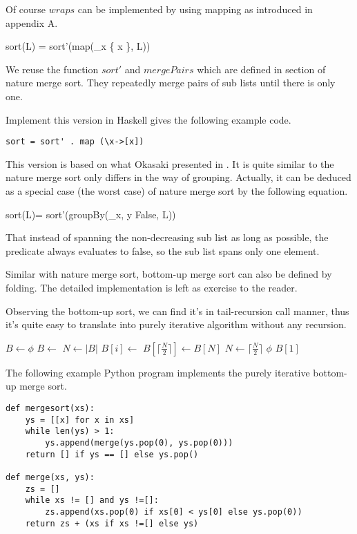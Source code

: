 \documentclass[UTF8]{article}
\begin{document}
Of course $wraps$ can be implemented by using mapping as introduced in appendix A.

\be
sort(L) = sort'(map(\lambda_x \cdot \{ x \}, L))
\ee

We reuse the function $sort'$ and $mergePairs$ which are defined in section of nature merge sort. They
repeatedly merge pairs of sub lists until there is only one.

Implement this version in Haskell gives the following example code.

\lstset{language=Haskell}
\begin{lstlisting}
sort = sort' . map (\x->[x])
\end{lstlisting}

This version is based on what Okasaki presented in \cite{okasaki-book}. It is quite similar to the nature merge sort
only differs in the way of grouping. Actually, it can be deduced as a special case (the worst case) of
nature merge sort by the following equation.

\be
sort(L)= sort'(groupBy(\lambda_{x, y} \cdot False, L))
\ee

That instead of spanning the non-decreasing sub list as long as possible, the predicate always evaluates to false,
so the sub list spans only one element.

Similar with nature merge sort, bottom-up merge sort can also be defined by folding. The detailed implementation
is left as exercise to the reader.

Observing the bottom-up sort, we can find it's in tail-recursion call manner, thus it's quite easy
to translate into purely iterative algorithm without any recursion.

\begin{algorithmic}[1]
  \State $B \gets \phi$
    \State $B \gets$ 
  \EndFor
  \State $N \gets |B|$
      \State $B[i] \gets$ 
    \EndFor
      \State $B[\lceil \frac{N}{2} \rceil] \gets B[N]$
    \EndIf
    \State $N \gets \lceil \frac{N}{2} \rceil$
  \EndWhile
    \State \Return $\phi$
  \EndIf
  \State \Return $B[1]$
\EndFunction
\end{algorithmic}

The following example Python program implements the purely iterative bottom-up merge sort.

\lstset{language=Python}
\begin{lstlisting}
def mergesort(xs):
    ys = [[x] for x in xs]
    while len(ys) > 1:
        ys.append(merge(ys.pop(0), ys.pop(0)))
    return [] if ys == [] else ys.pop()

def merge(xs, ys):
    zs = []
    while xs != [] and ys !=[]:
        zs.append(xs.pop(0) if xs[0] < ys[0] else ys.pop(0))
    return zs + (xs if xs !=[] else ys)
\end{lstlisting}
\end{document}
